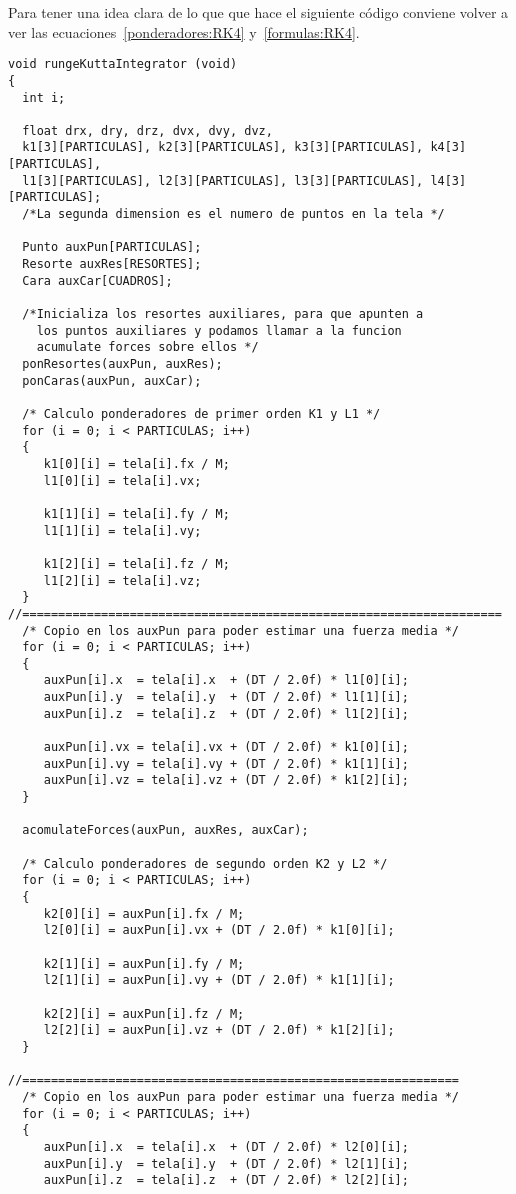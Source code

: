 Para tener una idea clara de lo que que hace el siguiente código conviene volver a ver las ecuaciones~\ref{ponderadores:RK4} y~\ref{formulas:RK4}.
\begin{verbatim}
void rungeKuttaIntegrator (void)
{
  int i;

  float drx, dry, drz, dvx, dvy, dvz,
  k1[3][PARTICULAS], k2[3][PARTICULAS], k3[3][PARTICULAS], k4[3][PARTICULAS],
  l1[3][PARTICULAS], l2[3][PARTICULAS], l3[3][PARTICULAS], l4[3][PARTICULAS];
  /*La segunda dimension es el numero de puntos en la tela */

  Punto auxPun[PARTICULAS];
  Resorte auxRes[RESORTES];
  Cara auxCar[CUADROS];

  /*Inicializa los resortes auxiliares, para que apunten a 
    los puntos auxiliares y podamos llamar a la funcion 
    acumulate forces sobre ellos */
  ponResortes(auxPun, auxRes);
  ponCaras(auxPun, auxCar);

  /* Calculo ponderadores de primer orden K1 y L1 */
  for (i = 0; i < PARTICULAS; i++)
  {
     k1[0][i] = tela[i].fx / M;
     l1[0][i] = tela[i].vx;

     k1[1][i] = tela[i].fy / M;
     l1[1][i] = tela[i].vy;

     k1[2][i] = tela[i].fz / M;
     l1[2][i] = tela[i].vz;
  }
//===================================================================
  /* Copio en los auxPun para poder estimar una fuerza media */
  for (i = 0; i < PARTICULAS; i++)
  {
     auxPun[i].x  = tela[i].x  + (DT / 2.0f) * l1[0][i];
     auxPun[i].y  = tela[i].y  + (DT / 2.0f) * l1[1][i];
     auxPun[i].z  = tela[i].z  + (DT / 2.0f) * l1[2][i];

     auxPun[i].vx = tela[i].vx + (DT / 2.0f) * k1[0][i];
     auxPun[i].vy = tela[i].vy + (DT / 2.0f) * k1[1][i];
     auxPun[i].vz = tela[i].vz + (DT / 2.0f) * k1[2][i];
  }

  acomulateForces(auxPun, auxRes, auxCar);

  /* Calculo ponderadores de segundo orden K2 y L2 */
  for (i = 0; i < PARTICULAS; i++)
  {
     k2[0][i] = auxPun[i].fx / M;
     l2[0][i] = auxPun[i].vx + (DT / 2.0f) * k1[0][i];

     k2[1][i] = auxPun[i].fy / M;
     l2[1][i] = auxPun[i].vy + (DT / 2.0f) * k1[1][i];

     k2[2][i] = auxPun[i].fz / M;
     l2[2][i] = auxPun[i].vz + (DT / 2.0f) * k1[2][i];
  }

//=============================================================
  /* Copio en los auxPun para poder estimar una fuerza media */
  for (i = 0; i < PARTICULAS; i++)
  {
     auxPun[i].x  = tela[i].x  + (DT / 2.0f) * l2[0][i];
     auxPun[i].y  = tela[i].y  + (DT / 2.0f) * l2[1][i];
     auxPun[i].z  = tela[i].z  + (DT / 2.0f) * l2[2][i];


\end{verbatim}
